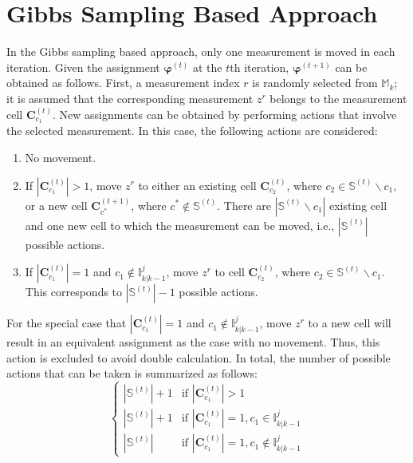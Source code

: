 \section{Gibbs Sampling Based Approach}
In the Gibbs sampling based approach, only one measurement is moved in each iteration. Given the assignment $\boldsymbol{\varphi}^{(t)}$ at the $t$th iteration, $\boldsymbol{\varphi}^{(t+1)}$ can be obtained as follows. First, a measurement index $r$ is randomly selected from $\mathbb{M}_k$; it is assumed that the corresponding measurement $z^r$ belongs to the measurement cell $\mathbf{C}^{(t)}_{c_1}$. New assignments can be obtained by performing actions that involve the selected measurement. In this case, the following actions are considered:
\begin{enumerate}
    \item No movement.
    \item If $|\mathbf{C}_{c_1}^{(t)}|>1$, move $z^r$ to either an existing cell $\mathbf{C}^{(t)}_{c_2}$, where $c_2\in\mathbb{S}^{(t)}\backslash c_1$, or a new cell $\mathbf{C}_{c^*}^{(t+1)}$, where $c^*\notin\mathbb{S}^{(t)}$. There are $|\mathbb{S}^{(t)}\backslash c_1|$ existing cell and one new cell to which the measurement can be moved, i.e., $|\mathbb{S}^{(t)}|$ possible actions. 
    \item If $|\mathbf{C}_{c_1}^{(t)}|=1$ and $c_1\notin\mathbb{I}^j_{k|k-1}$, move $z^r$ to cell $\mathbf{C}^{(t)}_{c_2}$, where $c_2\in\mathbb{S}^{(t)}\backslash c_1$. This corresponds to $|\mathbb{S}^{(t)}|-1$ possible actions. 
\end{enumerate}
For the special case that $|\mathbf{C}_{c_1}^{(t)}|=1$ and $c_1\notin\mathbb{I}^j_{k|k-1}$, move $z^r$ to a new cell will result in an equivalent assignment as the case with no movement. Thus, this action is excluded to avoid double calculation. In total, the number of possible actions that can be taken is summarized as follows:
$$\begin{cases}
|\mathbb{S}^{(t)}|+1 & \text{if   } |\mathbf{C}_{c_1}^{(t)}|>1 \\
|\mathbb{S}^{(t)}|+1 & \text{if   } |\mathbf{C}_{c_1}^{(t)}|=1, c_1\in\mathbb{I}^j_{k|k-1} \\
|\mathbb{S}^{(t)}| & \text{if   } |\mathbf{C}_{c_1}^{(t)}|=1, c_1\notin\mathbb{I}^j_{k|k-1}
\end{cases}$$

